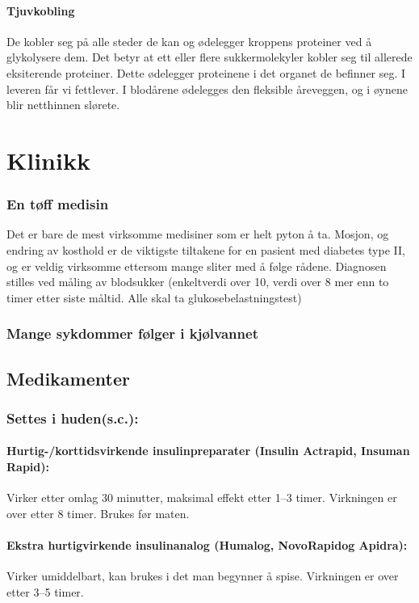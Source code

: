 			\paragraph{Tjuvkobling\\}
				De kobler seg på alle steder de kan og ødelegger kroppens proteiner ved å glykolysere dem. Det betyr at ett eller flere sukkermolekyler kobler seg til allerede eksiterende proteiner. Dette ødelegger proteinene i det organet de befinner seg. I leveren får vi fettlever. I blodårene ødelegges den fleksible åreveggen, og i øynene blir netthinnen slørete.
		\section{Klinikk}
			\subsubsection{En tøff medisin}
				Det er bare de mest virksomme medisiner som er helt pyton å ta. Mosjon, og endring av kosthold er de viktigste tiltakene for en pasient med diabetes type II, og er veldig virksomme ettersom mange sliter med å følge rådene. Diagnosen stilles ved måling av blodsukker (enkeltverdi over 10, verdi over 8 mer enn to timer etter siste måltid. Alle skal ta glukosebelastningstest)
			\subsubsection{Mange sykdommer følger i kjølvannet}
		\subsection{Medikamenter\cite{legevakthandboka}}
				\subsubsection{Settes i huden(s.c.):}
					\paragraph{Hurtig-/korttidsvirkende insulinpreparater (Insulin Actrapid\textregistered, Insuman Rapid\textregistered):\\}Virker etter omlag 30 minutter, maksimal effekt etter 1–3 timer. Virkningen er over etter 8 timer. Brukes før maten.

					\paragraph{Ekstra hurtigvirkende insulinanalog (Humalog\textregistered, NovoRapid\textregistered og Apidra\textregistered):}Virker  umiddelbart, kan brukes i det man begynner å spise. Virkningen er over etter 3–5 timer.

